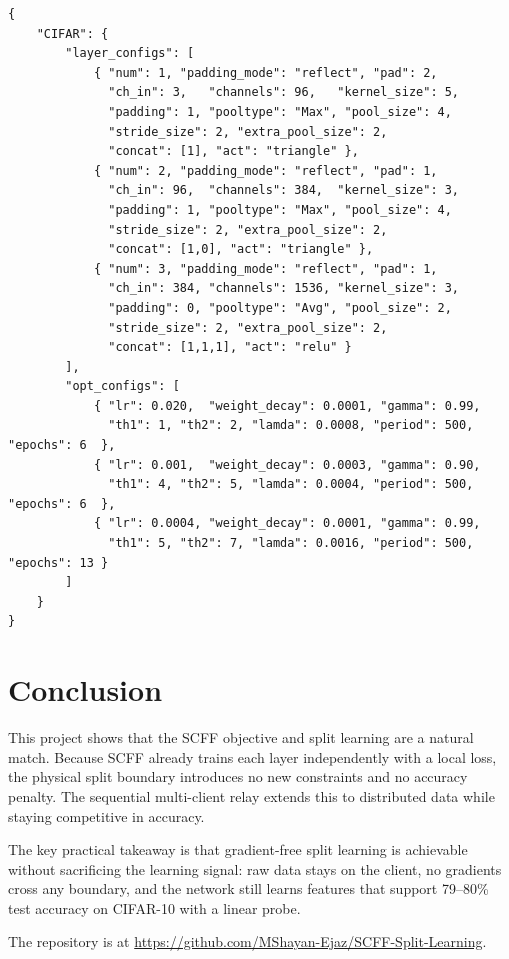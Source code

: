 \documentclass[12pt]{article}
\begin{document}
\begin{lstlisting}[language={},
                   caption={config.json --- CIFAR-10 network and optimizer configuration},
                   label={lst:config}]
{
    "CIFAR": {
        "layer_configs": [
            { "num": 1, "padding_mode": "reflect", "pad": 2,
              "ch_in": 3,   "channels": 96,   "kernel_size": 5,
              "padding": 1, "pooltype": "Max", "pool_size": 4,
              "stride_size": 2, "extra_pool_size": 2,
              "concat": [1], "act": "triangle" },
            { "num": 2, "padding_mode": "reflect", "pad": 1,
              "ch_in": 96,  "channels": 384,  "kernel_size": 3,
              "padding": 1, "pooltype": "Max", "pool_size": 4,
              "stride_size": 2, "extra_pool_size": 2,
              "concat": [1,0], "act": "triangle" },
            { "num": 3, "padding_mode": "reflect", "pad": 1,
              "ch_in": 384, "channels": 1536, "kernel_size": 3,
              "padding": 0, "pooltype": "Avg", "pool_size": 2,
              "stride_size": 2, "extra_pool_size": 2,
              "concat": [1,1,1], "act": "relu" }
        ],
        "opt_configs": [
            { "lr": 0.020,  "weight_decay": 0.0001, "gamma": 0.99,
              "th1": 1, "th2": 2, "lamda": 0.0008, "period": 500, "epochs": 6  },
            { "lr": 0.001,  "weight_decay": 0.0003, "gamma": 0.90,
              "th1": 4, "th2": 5, "lamda": 0.0004, "period": 500, "epochs": 6  },
            { "lr": 0.0004, "weight_decay": 0.0001, "gamma": 0.99,
              "th1": 5, "th2": 7, "lamda": 0.0016, "period": 500, "epochs": 13 }
        ]
    }
}
\end{lstlisting}

\section*{Conclusion}

This project shows that the SCFF objective and split learning are a natural match. Because SCFF
already trains each layer independently with a local loss, the physical split boundary
introduces no new constraints and no accuracy penalty. The sequential multi-client relay extends
this to distributed data while staying competitive in accuracy.

The key practical takeaway is that gradient-free split learning is achievable without
sacrificing the learning signal: raw data stays on the client, no gradients cross any boundary,
and the network still learns features that support 79--80\% test accuracy on CIFAR-10 with a
linear probe.

The repository is at \url{https://github.com/MShayan-Ejaz/SCFF-Split-Learning}.



\end{document}
